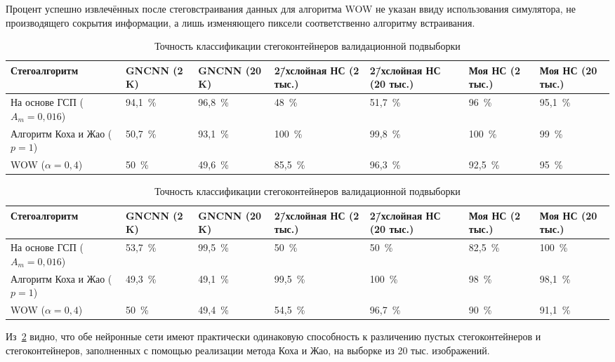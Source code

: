 Процент успешно извлечённых после стеговстраивания данных для алгоритма WOW не указан ввиду использования симулятора, не производящего сокрытия информации, а лишь изменяющего пиксели соответственно алгоритму встраивания.
\begin{landscape}

\begin{table}[h!]
\centering
    \begin{tabular}{| l | p{2cm} | p{2cm} | p{2cm} | p{2cm} | p{2cm} | p{2cm} |}
    \hline
    Стегоалгоритм & GNCNN (2 K) & GNCNN (20 K) & 2\=/хслойная НС (2 тыс.) & 2\=/хслойная НС (20 тыс.) & Моя НС (2 тыс.) & Моя НС (20 тыс.) \\ \hline
    На основе ГСП ($ A_m = 0,016 $) & 94,1~\% & 96,8~\% & 48~\% & 51,7~\% & 96~\% & 95,1~\% \\ \hline
    Алгоритм Коха и Жао ($ p = 1 $) & 50,7~\% & 93,1~\% & 100~\% & 99,8~\% & 100~\% & 99~\% \\ \hline
    WOW ($ \alpha = 0,4 $) & 50~\% & 49,6~\% & 85,5~\% & 96,3~\% & 92,5~\% & 95~\% \\ \hline
    \end{tabular}
\caption{Точность классификации стегоконтейнеров валидационной подвыборки}
\label{table:2}
\end{table}

\begin{table}[h!]
\centering
    \begin{tabular}{| l | p{2cm} | p{2cm} | p{2cm} | p{2cm} | p{2cm} | p{2cm} |}
    \hline
    Стегоалгоритм & GNCNN (2 K) & GNCNN (20 K) & 2\=/хслойная НС (2 тыс.) & 2\=/хслойная НС (20 тыс.) & Моя НС (2 тыс.) & Моя НС (20 тыс.) \\ \hline
    На основе ГСП ($ A_m = 0,016 $) & 53,7~\% & 99,5~\% & 50~\% & 50~\% & 82,5~\% & 100~\% \\ \hline
    Алгоритм Коха и Жао ($ p = 1 $) & 49,3~\% & 49,1~\% & 99,5~\% & 100~\% & 98~\% & 98,1~\% \\ \hline
    WOW ($ \alpha = 0,4 $) & 50~\% & 49,4~\% & 54,5~\% & 96,7~\% & 90~\% & 91,1~\% \\ \hline
    \end{tabular}
\caption{Точность классификации стегоконтейнеров валидационной подвыборки}
\label{table:2}
\end{table}
\end{landscape}

Из~\ref{table:2} видно, что обе нейронные сети имеют практически одинаковую способность к различению пустых стегоконтейнеров и стегоконтейнеров, заполненных с помощью реализации метода Коха и Жао, на выборке из 20 тыс. изображений.

